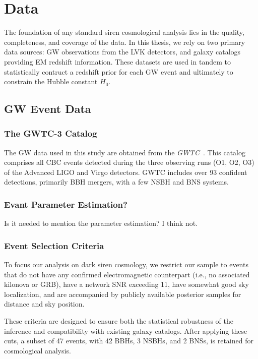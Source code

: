 \chapter{Data}
\label{chap:data}


The foundation of any standard siren cosmological analysis lies in the quality, completeness, and coverage of the data. In this thesis, we rely on two primary data sources: \ac{GW} observations from the \ac{LVK} detectors, and galaxy catalogs providing \ac{EM} redshift information. These datasets are used in tandem to statistically contruct a redshift prior for each \ac{GW} event and ultimately to constrain the Hubble constant $H_0$.

\section{\ac{GW} Event Data}

\subsection{The GWTC-3 Catalog}

The \ac{GW} data used in this study are obtained from the \textit{\ac{GWTC}}~\citep{abbott201gwtc1, abbott2021gwtc2, abbott2024gwtc21, abbott2023gwtc3}. This catalog comprises all \ac{CBC} events detected during the three observing runs (O1, O2, O3) of the Advanced LIGO and Virgo detectors. \ac{GWTC} includes over 93 confident detections, primarily \ac{BBH} mergers, with a few \ac{NSBH} and \ac{BNS} systems.

\subsection{Evant Parameter Estimation?}
Is it needed to mention the parameter estimation? I think not.

\subsection{Event Selection Criteria}

To focus our analysis on dark siren cosmology, we restrict our sample to events that do not have any confirmed electromagnetic counterpart (i.e., no associated kilonova or GRB), have a network \ac{SNR} exceeding 11, have somewhat good sky localization, and are accompanied by publicly available posterior samples for distance and sky position.

These criteria are designed to ensure both the statistical robustness of the inference and compatibility with existing galaxy catalogs. After applying these cuts, a subset of 47 events, with 42 \acp{BBH}, 3
\acp{NSBH}, and 2 \acp{BNS}, is retained for cosmological analysis.

